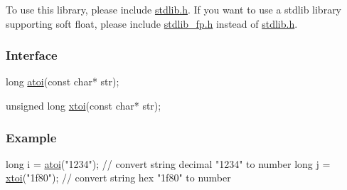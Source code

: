 To use this library, please include {\ttfamily \mbox{\hyperlink{a00032}{stdlib.\+h}}}. If you want to use a stdlib library supporting soft float, please include {\ttfamily \mbox{\hyperlink{a00035}{stdlib\+\_\+fp.\+h}}} instead of {\ttfamily \mbox{\hyperlink{a00032}{stdlib.\+h}}}.

\subsubsection*{Interface}


\begin{DoxyCode}
\textcolor{keywordtype}{long} \mbox{\hyperlink{a00032_a36f90d5de53f568b0fc5266ce013b9c5}{atoi}}(\textcolor{keyword}{const} \textcolor{keywordtype}{char}* str);

\textcolor{keywordtype}{unsigned} \textcolor{keywordtype}{long} \mbox{\hyperlink{a00032_a9d6165da864d16ad50c13690c1e7d7ea}{xtoi}}(\textcolor{keyword}{const} \textcolor{keywordtype}{char}* str);
\end{DoxyCode}


\subsubsection*{Example}


\begin{DoxyCode}
\textcolor{keywordtype}{long} i = \mbox{\hyperlink{a00032_a36f90d5de53f568b0fc5266ce013b9c5}{atoi}}(\textcolor{stringliteral}{"1234"});            \textcolor{comment}{// convert string decimal "1234" to number}
\textcolor{keywordtype}{long} j = \mbox{\hyperlink{a00032_a9d6165da864d16ad50c13690c1e7d7ea}{xtoi}}(\textcolor{stringliteral}{"1f80"});            \textcolor{comment}{// convert string hex "1f80" to number}
\end{DoxyCode}
 